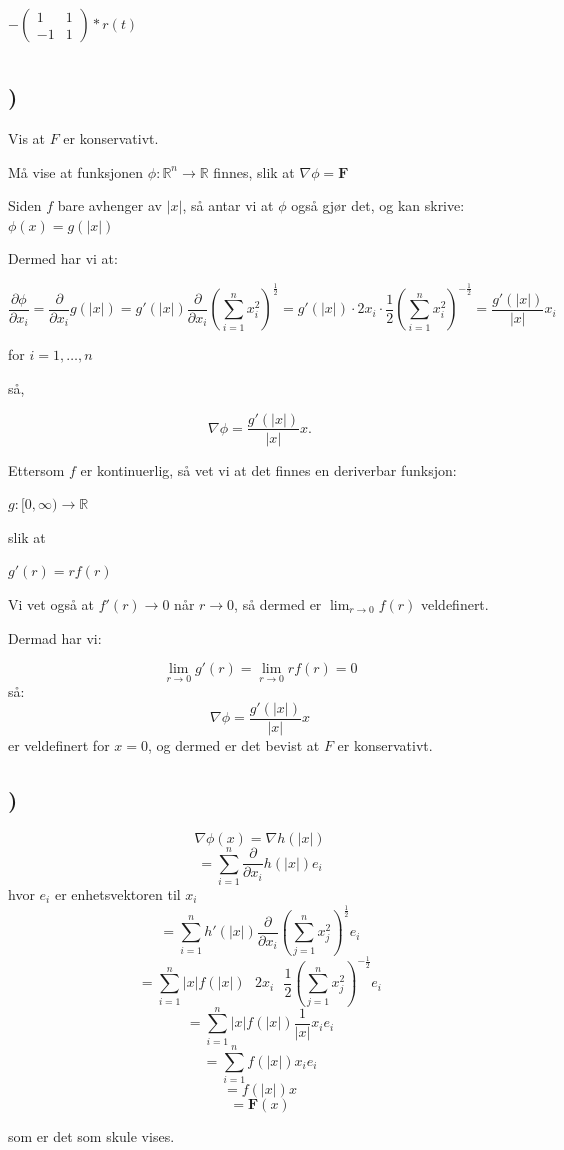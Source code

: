\documentclass[a4paper,10pt,norsk]{article}
\begin{document}
$- \left(\begin{matrix} 1&1\\-1&1 \end{matrix}\right) * r(t)$

\section{}
\subsection{)}
Vis at $F$ er konservativt.

Må vise at funksjonen $\phi:\mathbb{R}^n \rightarrow \mathbb{R}$ finnes, slik at $\nabla \phi = \mathbf{F}$

Siden $f$ bare avhenger av $|x|$, så antar vi at $\phi$ også gjør det, og kan skrive:
$\phi(x) = g(|x|)$

Dermed har vi at:

\[\frac{\partial \phi}{\partial x_i} = \frac{\partial}{\partial x_i}g(|x|) = g'(|x|)\frac{\partial}{\partial x_i} \left(\sum_{i=1}^n x_i^2\right)^{\frac{1}{2}} = g'(|x|)\cdot 2x_i\cdot\frac{1}{2}\left(\sum_{i=1}^n x_i^2\right)^{-\frac{1}{2}} = \frac{g'(|x|)}{|x|} x_i\]

for $i = 1,\dots , n$

så,

\[\nabla \phi = \frac{g'(|x|)}{|x|}x.\]


Ettersom $f$ er kontinuerlig, så vet vi at det finnes en deriverbar funksjon:

$g: [0,\infty) \rightarrow \mathbb{R}$

slik at 

$g'(r) = rf(r)$

Vi vet også at $f'(r) \rightarrow 0$ når $r \rightarrow 0$, så dermed er $\lim_{r\rightarrow 0} f(r)$ veldefinert.

Dermad har vi:

\[\lim_{r \rightarrow 0} g'(r) = \lim_{r\rightarrow 0} rf(r) = 0\]
så:
\[\nabla \phi = \frac{g'(|x|)}{|x|}x\]
er veldefinert for $x=0$, og dermed er det bevist at $F$ er konservativt.

\subsection{)}

\[\nabla \phi(x) = \nabla h(|x|)\] 
\[= \sum_{i=1}^n \frac{\partial}{\partial x_i} h(|x|) e_i\]
hvor $e_i$ er enhetsvektoren til $x_i$
\[= \sum_{i=1}^n h'(|x|)\frac{\partial}{\partial x_i}\left(\sum_{j=1}^n x_j^2\right)^{\frac{1}{2}} e_i \]
\[= \sum_{i=1}^n |x| f(|x|)\text{ }2x_i\text{ }\frac{1}{2}\left(\sum_{j=1}^n x_j^2\right)^{-\frac{1}{2}} e_i \]
\[= \sum_{i=1}^n |x| f(|x|)\frac{1}{|x|}x_i e_i \]
\[=  \sum_{i=1}^n f(|x|) x_i e_i\]
\[= f(|x|)x\]
\[= \mathbf{F}(x)\]

som er det som skule vises.
\end{document}
